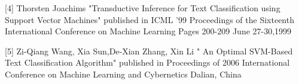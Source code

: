 \documentclass{report}
\begin{document}
[4] Thorsten Joachims "Transductive Inference for Text Classification using Support Vector Machines" published in ICML '99 Proceedings of the Sixteenth International Conference on Machine Learning Pages 200-209 June 27-30,1999 \\
\linebreak

[5] Zi-Qiang Wang, Xia Sun,De-Xian Zhang, Xin Li " An Optimal SVM-Based Text Classification Algorithm"
published in Proceedings of 2006 International Conference on Machine Learning and Cybernetics Dalian, China\\
\linebreak
\end{document}
